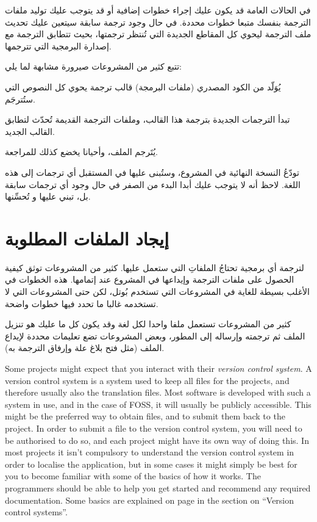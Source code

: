 في الحالات العامة قد يكون عليك إجراء خطوات إضافية أو قد يتوجب عليك توليد
ملفات الترجمة بنفسك متبعا خطوات محددة. في حال وجود ترجمة سابقة سيتعين
عليك تحديث ملف الترجمة ليحوي كل المقاطع الجديدة التي تُنتظر ترجمتها،
بحيث تتطابق الترجمة مع إصدارة البرمجية التي تترجمها.

تتبع كثير من المشروعات صيرورة مشابهة لما يلي:

  

\startitemize[1]
\item يُوَلّد من الكود المصدري (ملفات البرمجة) قالب ترجمة يحوي كل النصوص
التي ستُترجَم.
\item تبدأ الترجمات الجديدة بترجمة هذا القالب، وملفات الترجمة القديمة
تُحدّث لتطابق القالب الجديد.
\item يُتَرجم الملف، وأحيانا يخضع كذلك للمراجعة.
\item تودّعُ النسخة النهائية في المشروع، وستُبنى عليها في المستقبل أي
ترجمات إلى هذه اللغة.
\stopitemize
لاحظ أنه لا يتوجب عليك أبدا البدء من الصفر في حال وجود أي ترجمات سابقة
بل، تبني عليها و تُحسِّنها.

\section{إيجاد الملفات المطلوبة}
لترجمة أي برمجية تحتاجُ الملفاتِ التي ستعمل عليها. كثير من المشروعات
توثق كيفية الحصول على ملفات الترجمة وإيداعها في المشروع عند إتمامها.
هذه الخطوات في الأغلب بسيطة للغاية في المشروعات التي تستخدم بُوتل، لكن
حتى المشروعات التي لا تستخدمه غالبا ما تحدد فيها خطوات واضحة.

كثير من المشروعات تستعمل ملفا واحدا لكل لغة وقد يكون كل ما عليك هو تنزيل
الملف ثم ترجمته وإرساله إلى المطور، وبعض المشروعات تضع تعليمات محددة
لإيداع الملف (مثل فتح بلاغ علة وإرفاق الترجمة به).

Some projects might expect that you interact with their {\it version
control system}. A version control system is a system used to keep all
files for the projects, and therefore usually also the translation
files. Most software is developed with such a system in use, and in the
case of FOSS, it will usually be publicly accessible. This might be the
preferred way to obtain files, and to submit them back to the project.
In order to submit a file to the version control system, you will need
to be authorised to do so, and each project might have its own way of
doing this. In most projects it isn’t compulsory to understand the
version control system in order to localise the application, but in
some cases it might simply be best for you to become familiar with some
of the basics of how it works. The programmers should be able to help
you get started and recommend any required documentation. Some basics
are explained on page \at[ref:34384626] in the section on
“Version control systems”.

